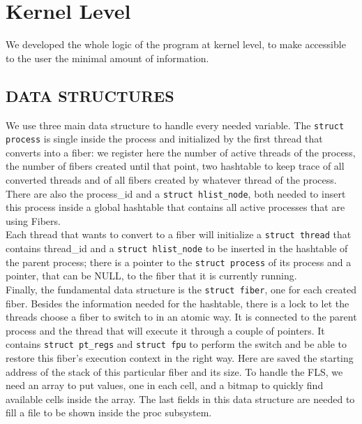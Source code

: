 \documentclass[a4paper]{article}
\begin{document}
\section{Kernel Level}
We developed the whole logic of the program at kernel level, to make accessible to the user the minimal amount of information.

\subsection*{DATA STRUCTURES}
We use three main data structure to handle every needed variable. The \texttt{struct process} is single inside the process and initialized by the first thread that converts into a fiber: we register here the number of active threads of the process, the number of fibers created until that point, two hashtable to keep trace of all converted threads and of all fibers created by whatever thread of the process. There are also the process\_id and a \texttt{struct hlist\_node}, both needed to insert this process inside a global hashtable that contains all active processes that are using Fibers.\bigskip\\
Each thread that wants to convert to a fiber will initialize a \texttt{struct thread} that contains thread\_id and a \texttt{struct hlist\_node} to be inserted in the hashtable of the parent process; there is a pointer to the \texttt{struct process} of its process and a pointer, that can be NULL, to the fiber that it is currently running.\bigskip\\
Finally, the fundamental data structure is the \texttt{struct fiber}, one for each created fiber. Besides the information needed for the hashtable, there is a lock to let the threads choose a fiber to switch to in an atomic way. It is connected to the parent process and the thread that will execute it through a couple of pointers. It contains \texttt{struct pt\_regs} and \texttt{struct fpu} to perform the switch and be able to restore this fiber's execution context in the right way. Here are saved the starting address of the stack of this particular fiber and its size. To handle the FLS, we need an array to put values, one in each cell, and a bitmap to quickly find available cells inside the array. The last fields in this data structure are needed to fill a file to be shown inside the proc subsystem.
\end{document}
